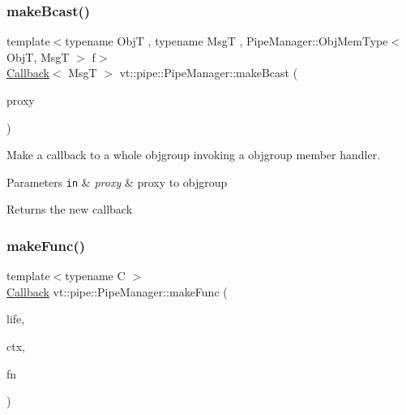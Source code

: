 \subsubsection{\texorpdfstring{make\+Bcast()}{makeBcast()}\hspace{0.1cm}{\footnotesize\ttfamily [7/7]}}
{\footnotesize\ttfamily template$<$typename ObjT , typename MsgT , Pipe\+Manager\+::\+Obj\+Mem\+Type$<$ Obj\+T, Msg\+T $>$ f$>$ \\
\hyperlink{namespacevt_a57b238783d05de96bc2c4027f7073b7f}{Callback}$<$ MsgT $>$ vt\+::pipe\+::\+Pipe\+Manager\+::make\+Bcast (\begin{DoxyParamCaption}\item[{\hyperlink{structvt_1_1objgroup_1_1proxy_1_1_proxy}{objgroup\+::proxy\+::\+Proxy}$<$ ObjT $>$}]{proxy }\end{DoxyParamCaption})}



Make a callback to a whole objgroup invoking a objgroup member handler. 


\begin{DoxyParams}[1]{Parameters}
\mbox{\tt in}  & {\em proxy} & proxy to objgroup\\
\hline
\end{DoxyParams}
\begin{DoxyReturn}{Returns}
the new callback 
\end{DoxyReturn}
\mbox{\label{structvt_1_1pipe_1_1_pipe_manager_a2b956c73ec6f6d03621bfe5e6a96c782}} 
\subsubsection{\texorpdfstring{make\+Func()}{makeFunc()}\hspace{0.1cm}{\footnotesize\ttfamily [1/6]}}
{\footnotesize\ttfamily template$<$typename C $>$ \\
\hyperlink{namespacevt_a57b238783d05de96bc2c4027f7073b7f}{Callback} vt\+::pipe\+::\+Pipe\+Manager\+::make\+Func (\begin{DoxyParamCaption}\item[{\hyperlink{namespacevt_1_1pipe_acb42b284378c0fdac1d7c6335dc26f58}{Lifetime\+Enum}}]{life,  }\item[{C $\ast$}]{ctx,  }\item[{\hyperlink{structvt_1_1pipe_1_1_pipe_manager_base_ad8463823b6b4cfdb67c119d6d22e3bac}{Func\+Ctx\+Type}$<$ C $>$}]{fn }\end{DoxyParamCaption})}

